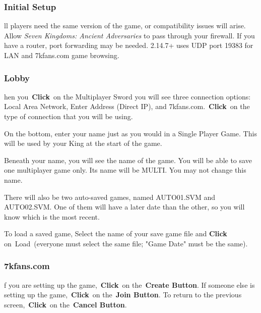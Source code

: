 \subsubsection{Initial Setup} %

ll players need the same version of the game, or compatibility issues will arise. Allow \textit{Seven Kingdoms: Ancient Adversaries} to pass through your firewall. If you have a router, port forwarding may be needed. 2.14.7+ uses UDP port 19383 for LAN and 7kfans.com game browsing.

\subsubsection{Lobby}

hen you \textbf{Click} on the Multiplayer Sword you will see three connection options: Local Area Network, Enter Address (Direct IP), and 7kfans.com. \textbf{Click} on the type of connection that you will be using.

On the bottom, enter your name just as you would in a Single Player Game. This will be used by your King at the start of the game.

Beneath your name, you will see the name of the game. You will be able to save one multiplayer game only. Its name will be MULTI. You may not change this name.

There will also be two auto-saved games, named AUTO01.SVM and AUTO02.SVM. One of them will have a later date than the other, so you will know which is the most recent.

To load a saved game, Select the name of your save game file and \textbf{Click} on Load (everyone must select the same file; "Game Date" must be the same).

\subsubsection{7kfans.com}

f you are setting up the game, \textbf{Click} on the \textbf{Create Button}. If someone else is setting up the game, \textbf{Click} on the \textbf{Join Button}. To return to the previous screen, \textbf{Click} on the \textbf{Cancel Button}.

